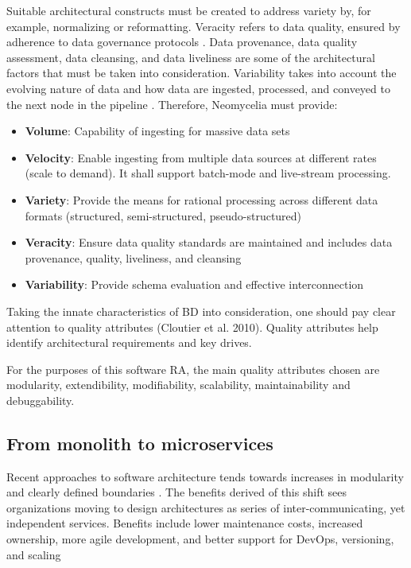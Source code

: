 \documentclass[runningheads]{llncs}
\begin{document}
Suitable architectural constructs must be created to address variety by, for example, normalizing or reformatting. Veracity refers to data quality, ensured by adherence to data governance protocols \cite{Plotkin}. Data provenance, data quality assessment, data cleansing, and data liveliness are some of the architectural factors that must be taken into consideration. Variability takes into account the evolving nature of data and how data are ingested, processed, and conveyed to the next node in the pipeline \cite{Nadal}. Therefore, Neomycelia must provide:

\begin{itemize}
    \item \textbf{Volume}: Capability of ingesting for massive data sets
    \item \textbf{Velocity}: Enable ingesting from multiple data sources at different rates (scale to demand). It shall support batch-mode and live-stream processing.
    \item \textbf{Variety}: Provide the means for rational processing across different data formats (structured, semi-structured, pseudo-structured)
    \item \textbf{Veracity}: Ensure data quality standards are maintained and includes data provenance, quality, liveliness, and cleansing
    \item \textbf{Variability}: Provide schema evaluation and effective interconnection
\end{itemize}

Taking the innate characteristics of BD into consideration, one should pay clear attention to quality attributes (Cloutier et al. 2010). Quality attributes help identify architectural requirements and key drives.


For the purposes of this software RA, the main quality attributes chosen are modularity, extendibility, modifiability, scalability, maintainability and debuggability.


\subsection{From monolith to microservices}
Recent approaches to software architecture tends towards increases in modularity and clearly defined boundaries \cite{Jamshidi}. The benefits derived of this shift sees organizations moving to design architectures as series of inter-communicating, yet independent services. Benefits include lower maintenance costs, increased ownership, more agile development, and better support for DevOps, versioning, and scaling \cite{Fritzsch}
\end{document}
